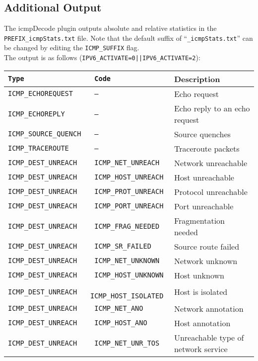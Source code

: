 \documentclass[documentation]{subfiles}
\begin{document}
\subsection{Additional Output}\label{icmpDecode:additonalOutput}
The icmpDecode plugin outputs absolute and relative statistics in the {\tt PREFIX\_icmpStats.txt} file.
Note that the default suffix of ``{\tt \_icmpStats.txt}'' can be changed  by editing the {\tt ICMP\_SUFFIX} flag.\\

The output is as follows ({\tt IPV6\_ACTIVATE=0||IPV6\_ACTIVATE=2}):
\begin{longtable}{>{\tt}l>{\tt}ll}
    \toprule
    {\bf Type}           & {\bf Code}            & {\bf Description}\\
    \midrule\endhead%
    ICMP\_ECHOREQUEST    & ---                   & Echo request \\
    ICMP\_ECHOREPLY      & ---                   & Echo reply to an echo request \\
    ICMP\_SOURCE\_QUENCH & ---                   & Source quenches \\
    ICMP\_TRACEROUTE     & ---                   & Traceroute packets\\
    ICMP\_DEST\_UNREACH  & ICMP\_NET\_UNREACH    & Network unreachable \\
    ICMP\_DEST\_UNREACH  & ICMP\_HOST\_UNREACH   & Host unreachable \\
    ICMP\_DEST\_UNREACH  & ICMP\_PROT\_UNREACH   & Protocol unreachable \\
    ICMP\_DEST\_UNREACH  & ICMP\_PORT\_UNREACH   & Port unreachable \\
    ICMP\_DEST\_UNREACH  & ICMP\_FRAG\_NEEDED    & Fragmentation needed \\
    ICMP\_DEST\_UNREACH  & ICMP\_SR\_FAILED      & Source route failed \\
    ICMP\_DEST\_UNREACH  & ICMP\_NET\_UNKNOWN    & Network unknown \\
    ICMP\_DEST\_UNREACH  & ICMP\_HOST\_UNKNOWN   & Host unknown \\
    ICMP\_DEST\_UNREACH  & ICMP\_HOST\_ISOLATED  & Host is isolated \\
    ICMP\_DEST\_UNREACH  & ICMP\_NET\_ANO        & Network annotation \\
    ICMP\_DEST\_UNREACH  & ICMP\_HOST\_ANO       & Host annotation \\
    ICMP\_DEST\_UNREACH  & ICMP\_NET\_UNR\_TOS   & Unreachable type of network service \\

\end{longtable}
\end{document}
